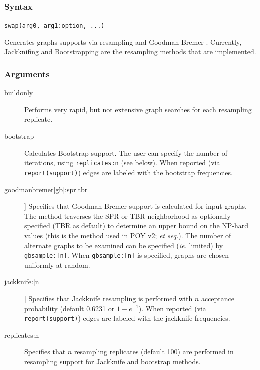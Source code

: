	\subsubsection{Syntax}
		\texttt{swap(arg0, arg1:option, ...)}
		
	\begin{phygdescription}
		{Generates graphs supports via resampling \citep{Farrisetal1996} and Goodman-Bremer 
		\citep{Goodmanetal1982, bremer1994}. Currently, Jackknifing and Bootstrapping 
		are the resampling methods that are implemented.}
	\end{phygdescription}
		
	\subsubsection{Arguments}
		\begin{description}
			\item[buildonly] Performs very rapid, but not extensive graph searches for each 
			resampling replicate.
		
			\item[bootstrap] Calculates Bootstrap support. The user can specify the 
			number of iterations, using \texttt{replicates:n} (see below).
			When reported (via \texttt{report(support)}) edges are labeled with the bootstrap frequencies.
		
			\item[goodmanbremer|gb[:spr|tbr]] Specifies that Goodman-Bremer support is 
			calculated for input graphs. The method traverses the SPR or TBR neighborhood 
			as optionally specified (TBR as default) to determine an upper bound on the NP-hard 
			values (this is the method used in POY v2; \citealp{POY2} \textit{et seq.}). The number 
			of alternate graphs to be examined can be specified (\textit{ie.} limited) by \texttt{gbsample:[n]}. 
			When \texttt{gbsample:[n]} is specified, graphs are chosen uniformly at random.
		
			\item[jackknife:[n]] Specifies that Jackknife resampling is performed with $n$ acceptance 
			probability (default 0.6231 or $1 - e^{-1}$). When reported (via \texttt{report(support)}) 
			edges are labeled with the jackknife frequencies.
		
			\item[replicates:n] Specifies that $n$ resampling replicates (default 100) are performed 
			in resampling support for Jackknife and bootstrap methods.
		\end{description}	
